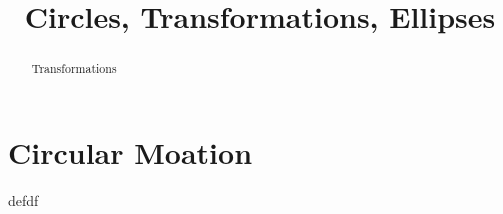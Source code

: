 \documentclass{ximera}
\title{Circles, Transformations, Ellipses}
\begin{document}
\begin{abstract}
Transformations
\end{abstract}
\maketitle


\section{Circular Moation}

\begin{example}  \label{Ex:sdfdsfdfL}
defdf
\end{example}
\end{document}
